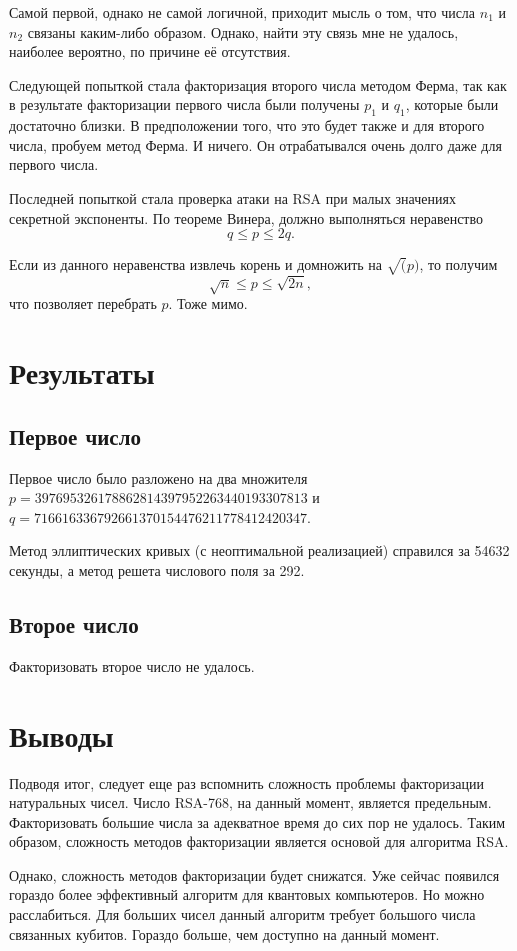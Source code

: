 \documentclass[a4paper,12pt]{article}
\begin{document}
Самой первой, однако не самой логичной, приходит мысль о том,
что числа $n_1$ и $n_2$ связаны каким-либо образом. Однако, найти эту связь
мне не удалось, наиболее вероятно, по причине её отсутствия.

Следующей попыткой стала факторизация второго числа методом
Ферма, так как в результате факторизации первого числа
были получены $p_1$ и $q_1$, которые были достаточно близки.
В предположении того, что это будет также и для второго числа,
пробуем метод Ферма. И ничего. Он отрабатывался очень долго даже для
первого числа.


Последней попыткой стала проверка атаки на RSA при малых
значениях секретной экспоненты. По теореме Винера, должно
выполняться неравенство $$q \le p \le 2q.$$

Если из данного неравенства извлечь корень и домножить на $\sqrt(p)$,
то получим
$$\sqrt{n} \le p \le \sqrt{2n},$$
что позволяет перебрать $p$. Тоже мимо.

\section{Результаты}
\subsection{Первое число}
Первое число было разложено на два множителя
$p = 397695326178862814397952263440193307813$ и
$q = 716616336792661370154476211778412420347$.

Метод эллиптических кривых (с неоптимальной реализацией) справился
за 54632 секунды, а метод решета числового поля за 292.

\subsection{Второе число}
Факторизовать второе число не удалось.

\section{Выводы}
Подводя итог, следует еще раз вспомнить сложность проблемы факторизации
натуральных чисел. Число RSA-768, на данный момент, является предельным.
Факторизовать большие числа за адекватное время до сих пор не удалось.
Таким образом, сложность методов факторизации является основой
для алгоритма RSA.

Однако, сложность методов факторизации будет снижатся. Уже
сейчас появился гораздо более эффективный алгоритм для
квантовых компьютеров. Но можно расслабиться. Для больших
чисел данный алгоритм требует большого числа связанных кубитов.
Гораздо больше, чем доступно на данный момент.
\end{document}
